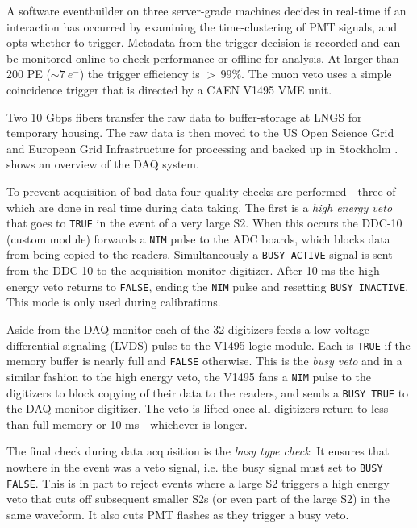 A software eventbuilder on three server-grade machines decides in real-time if an interaction has occurred by examining the
time-clustering of PMT signals, and opts whether to trigger.  Metadata from the trigger decision is recorded and can be monitored
online to check performance or offline for analysis.  At larger than 200 PE (${\sim}7\ e^-$) the trigger efficiency is ${>}\, 99\%$.  The
muon veto uses a simple coincidence trigger that is directed by a CAEN V1495 VME unit.

Two 10 Gbps fibers transfer the raw data to buffer-storage at LNGS for temporary housing.  The raw data is then moved to the US Open
Science Grid and European Grid Infrastructure for processing and backed up in Stockholm
.   shows an overview of the DAQ system.

To prevent acquisition of bad data four quality checks are performed - three of which are done in real time during data taking.  The
first is a \textit{high energy veto} that goes to \texttt{TRUE} in the event of a very large S2.  When this occurs the DDC-10 (custom
module) forwards a \texttt{NIM} pulse to the ADC boards, which blocks data from being copied to the readers.  Simultaneously a
\texttt{BUSY ACTIVE} signal is sent from the DDC-10 to the
acquisition monitor digitizer.  After 10 ms the high energy veto returns to \texttt{FALSE}, ending the \texttt{NIM} pulse and resetting
\texttt{BUSY INACTIVE}.  This mode is only used during calibrations.

Aside from the DAQ monitor each of the 32 digitizers feeds a low-voltage differential signaling (LVDS) pulse to the V1495 logic
module.  Each
is \texttt{TRUE} if the memory buffer is nearly full and \texttt{FALSE} otherwise.  This is the \textit{busy veto} and in a
similar fashion to the high energy veto,
the V1495 fans a \texttt{NIM} pulse to the digitizers to block copying of their data to the readers, and sends a \texttt{BUSY TRUE} to the
DAQ monitor digitizer.  The veto is lifted once all digitizers return to less than full memory or 10 ms - whichever is longer.

The final check during data acquisition is the \textit{busy type check}.  It ensures that nowhere in the event was a veto
signal, i.e. the busy signal must set to \texttt{BUSY FALSE}.  This is in part to reject events where a large S2 triggers a high energy
veto that cuts off subsequent smaller S2s (or even part of the large S2) in the same waveform.  It also cuts PMT flashes as they
trigger a busy veto.

